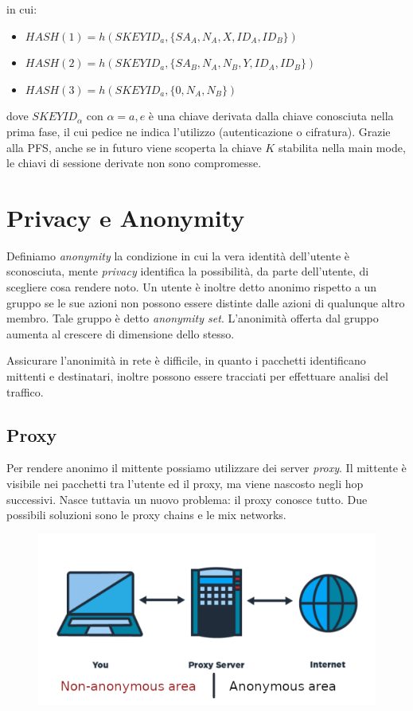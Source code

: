 \documentclass[a4paper, 11pt, notitlepage, fleqn]{report}
\begin{document}
in cui:
\begin{itemize}
	\item $HASH(1) = h(SKEYID_a,\{SA_A,N_A,X,ID_A,ID_B\})$
	\item $HASH(2) = h(SKEYID_a,\{SA_B,N_A,N_B,Y,ID_A,ID_B\})$
	\item $HASH(3) = h(SKEYID_a,\{0,N_A,N_B\})$
\end{itemize}
dove $SKEYID_\alpha$ con $\alpha=a,e$ è una chiave derivata dalla chiave conosciuta nella prima fase, il cui pedice ne indica l'utilizzo (autenticazione o cifratura). Grazie alla PFS, anche se in futuro viene scoperta la chiave $K$ stabilita nella main mode, le chiavi di sessione derivate non sono compromesse.


\chapter{Privacy e Anonymity}
Definiamo \emph{anonymity} la condizione in cui la vera identità dell'utente è sconosciuta, mente \emph{privacy} identifica la possibilità, da parte dell'utente, di scegliere cosa rendere noto. Un utente è inoltre detto anonimo rispetto a un gruppo se le sue azioni non possono essere distinte dalle azioni di qualunque altro membro. Tale gruppo è detto \emph{anonymity set}. L'anonimità offerta dal gruppo aumenta al crescere di dimensione dello stesso.

Assicurare l'anonimità in rete è difficile, in quanto i pacchetti identificano mittenti e destinatari, inoltre possono essere tracciati per effettuare analisi del traffico.

\section{Proxy}
Per rendere anonimo il mittente possiamo utilizzare dei server \emph{proxy}. Il mittente è visibile nei pacchetti tra l'utente ed il proxy, ma viene nascosto negli hop successivi. Nasce tuttavia un nuovo problema: il proxy conosce tutto. Due possibili soluzioni sono le proxy chains e le mix networks.
\begin{figure}[htp]
	\centering
	\includegraphics[width=.7\textwidth]{images/proxy2}
\end{figure}
\end{document}
